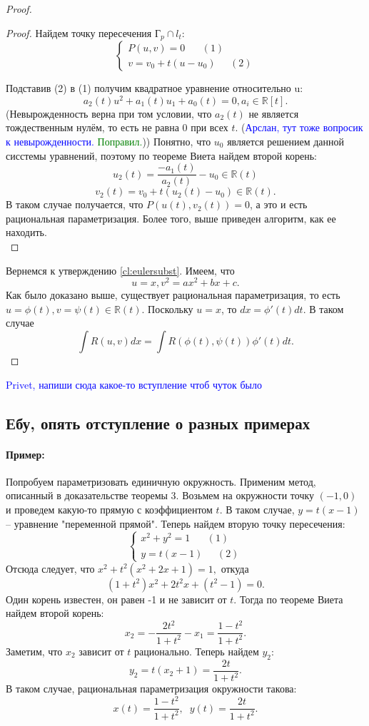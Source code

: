 \documentclass{article}
\theoremstyle{plain}
\theoremstyle{definition}
\theoremstyle{remark}
\renewcommand{\*}{\cdot}
\begin{document}
\begin{proof}
\begin{proof}
Найдем точку пересечения Г$_p \cap l_t$:
\begin{equation*}
    \left\{
\begin{aligned}
P(u, v) = 0 \;\;\;\;\;\; (1)\\
v = v_0 + t(u - u_0)\;\;\;\;\; (2)
\end{aligned}
\right.
\end{equation*}

Подставив (2) в (1) получим квадратное уравнение относительно u: \[a_2(t)u^2 + a_1(t)u_1 + a_0(t) = 0, a_i \in \mathbb{R}[t].\] (Невырожденность верна при том условии, что $a_2(t)$ не является тождественным нулём, то есть не равна $0$ при всех $t$. (\textcolor{blue}{Арслан, тут тоже вопросик к невырожденности.} \textcolor{green}{Поправил.})) Понятно, что $u_0$ является решением данной сисстемы уравнений, поэтому по теореме Виета найдем второй корень: \[u_2(t) = \frac{-a_1(t)}{a_2(t)} - u_0 \in \mathbb{R}(t)\] \[v_2(t) = v_0 + t(u_2(t) - u_0) \in \mathbb{R}(t).\] В таком случае получается, что $P(u(t), v_2(t)) = 0$, а это и есть рациональная параметризация. Более того, выше приведен алгоритм, как ее находить.\\
\end{proof}
Вернемся к утверждению \ref{cl:eulersubst}. Имеем, что \[u = x, v^2 = ax^2 + bx + c.\] Как было доказано выше, существует рациональная параметризация, то есть $u = \phi(t), v = \psi(t) \in \mathbb{R}(t).$ Поскольку $u = x$, то $dx = \phi'(t)dt.$ В таком случае \[\int R(u, v)dx = \int R(\phi(t), \psi(t))\phi'(t)dt.\]


\end{proof}

\textcolor{blue}{Privet, напиши сюда какое-то вступление чтоб чуток было}
\subsection{Ебу, опять отступление о разных примерах}
\paragraph{Пример:} Попробуем параметризовать единичную окружность. Применим метод, описанный в доказательстве теоремы 3. Возьмем на окружности точку $(-1, 0)$ и проведем какую-то прямую с коэффициентом $t$. В таком случае, $y = t(x-1) $ -- уравнение "переменной прямой". Теперь найдем вторую точку пересечения:
\[
\left\{
\begin{aligned}
x^2 + y^2 = 1 \;\;\;\;\;\; (1)\\
y = t(x-1)\;\;\;\;\; (2)
\end{aligned}
\right.
\]
Отсюда следует, что $x^2 + t^2(x^2 + 2x + 1) = 1,$ откуда \[(1 + t^2)x^2 + 2t^2x + (t^2 - 1) = 0.\] Один корень известен, он равен -1 и не зависит от $t$. Тогда по теореме Виета найдем второй корень: \[x_2 = -\frac{2t^2}{1+t^2} -x_1 = \frac{1-t^2}{1+t^2}.\] Заметим, что $x_2$ зависит от $t$ рационально. Теперь найдем $y_2$: $$y_2 = t(x_2 + 1) = \frac{2t}{1+t^2}.$$ В таком случае, рациональная параметризация окружности такова: \[x(t) = \frac{1 - t^2}{1 + t^2},\;\; y(t) = \frac{2t}{1 + t^2}.\]
\end{document}
